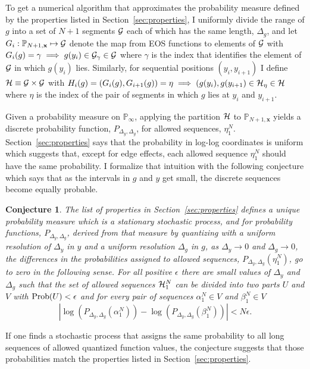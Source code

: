 \documentclass[]{article}
\newcommand{\field}[1]{\mathbb{#1}}
\newcommand\Polytope[1]{\field{P}_{#1}}
\newcommand\PolytopeInf{\Polytope{\infty}}
\newcommand\logx{y}
\newcommand\logf{g}
\newcommand\Logf{G}
\newtheorem{conjecture}{Conjecture}
\begin{document}
\newcommand{\SG}{{\cal G}} \newcommand{\SH}{{\cal H}} To get a
numerical algorithm that approximates the probability measure defined
by the properties listed in Section~\ref{sec:properties}, I uniformly
divide the range of $\logf$ into a set of $N+1$ segments $\SG$ each of
which has the same length, $\Delta_\logf$, and let
$G_i:\Polytope{N+1,\mathbf{x}} \mapsto \SG$ denote the map from EOS
functions to elements of $\SG$ with $G_i(\logf) = \gamma \implies
\logf(\logx_i) \in \SG_\gamma \in \SG$ where $\gamma$ is the index
that identifies the element of $\SG$ in which $\logf(\logx_i)$ lies.
Similarly, for sequential positions $(\logx_i,\logx_{i+1})$ I define
$\SH \equiv \SG \times \SG$ with $H_i(\logf) =
(\Logf_i(\logf),\Logf_{i+1}(\logf)) = \eta \implies (\logf(\logx_i),
\logf(\logx_{i+1}) \in \SH_\eta \in \SH$ where $\eta$ is the index of
the pair of segments in which $\logf$ lies at $\logx_i$ and
$\logx_{i+1}$.

Given a probability measure on $\PolytopeInf$, applying the partition
$\SH$ to $\Polytope{N+1,\mathbf{x}}$ yields a discrete probability
function, $P_{\Delta_y ,\Delta_\logf}$, for allowed sequences,
$\eta_1^N$.  Section~\ref{sec:properties} says that the probability in
log-log coordinates is uniform which suggests that, except for edge
effects, each allowed sequence $\eta_1^N$ should have the same
probability.  I formalize that intuition with the following conjecture
which says that as the intervals in $\logf$ and $\logx$ get small, the
discrete sequences become equally probable.
\begin{conjecture}
  \label{conjecture}
  The list of properties in Section~\ref{sec:properties} defines a
  unique probability measure which is a stationary stochastic process,
  and for probability functions, $P_{\Delta_y ,\Delta_\logf}$, derived
  from that measure by quantizing with a uniform resolution of
  $\Delta_y $ in $y$ and a uniform resolution $\Delta_\logf$ in
  $\logf$, as $\Delta_y \rightarrow 0$ and $\Delta_\logf \rightarrow
  0$, the differences in the probabilities assigned to allowed
  sequences, $P_{\Delta_y ,\Delta_\logf}(\eta_1^N)$, go to zero in the
  following sense.  For all positive $\epsilon$ there are small values
  of $\Delta_y $ and $\Delta_\logf$ such that the set of allowed
  sequences $\SH_1^{N}$ can be divided into two parts $U$ and $V$ with
  $\text{Prob}(U) < \epsilon$ and for every pair of sequences $\alpha_1^N
  \in V$ and $\beta_1^N \in V$
  \begin{equation}
    \label{eq:equipartition}
    \left| \log(P_{\Delta_y ,\Delta_\logf}(\alpha_1^N)) -
      \log(P_{\Delta_y ,\Delta_\logf}(\beta_1^N)) \right| < N\epsilon.
  \end{equation}
\end{conjecture}
If one finds a stochastic process that assigns the same probability to
all long sequences of allowed quantized function values, the
conjecture suggests that those probabilities match the properties
listed in Section~\ref{sec:properties}.
\end{document}
